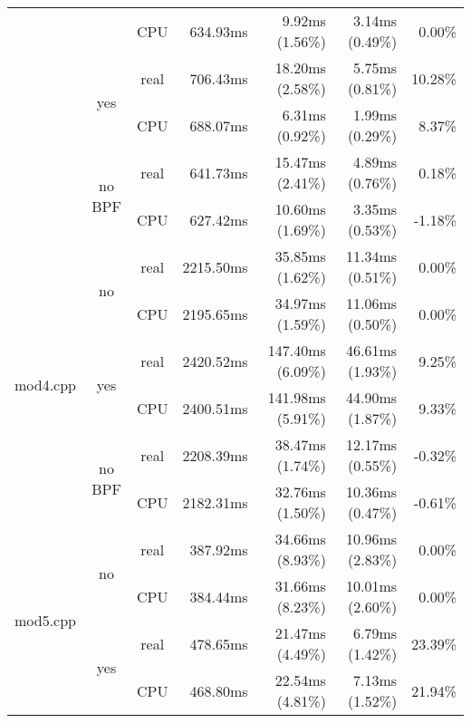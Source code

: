 \documentclass[en]{pracamgr}
\begin{document}
\begin{appendices}
\begin{small}
\begin{longtable}{|l|c|c|r|r|r|r|}
                            &                         & CPU  & 634.93ms & 9.92ms (1.56\%) & 3.14ms (0.49\%) & 0.00\% \\*
                            \cline{2-7}
                            & \multirow{2}{*}{yes}    & real & 706.43ms & 18.20ms (2.58\%) & 5.75ms (0.81\%) & 10.28\% \\*
                            &                         & CPU  & 688.07ms & 6.31ms (0.92\%) & 1.99ms (0.29\%) & 8.37\% \\*
                            \cline{2-7}
                            & \multirow{2}{*}{no BPF} & real & 641.73ms & 15.47ms (2.41\%) & 4.89ms (0.76\%) & 0.18\% \\*
                            &                         & CPU  & 627.42ms & 10.60ms (1.69\%) & 3.35ms (0.53\%) & -1.18\% \\
\hline
\multirow{6}{*}{mod4.cpp}   & \multirow{2}{*}{no}     & real & 2215.50ms & 35.85ms (1.62\%) & 11.34ms (0.51\%) & 0.00\% \\*
                            &                         & CPU  & 2195.65ms & 34.97ms (1.59\%) & 11.06ms (0.50\%) & 0.00\% \\*
                            \cline{2-7}
                            & \multirow{2}{*}{yes}    & real & 2420.52ms & 147.40ms (6.09\%) & 46.61ms (1.93\%) & 9.25\% \\*
                            &                         & CPU  & 2400.51ms & 141.98ms (5.91\%) & 44.90ms (1.87\%) & 9.33\% \\*
                            \cline{2-7}
                            & \multirow{2}{*}{no BPF} & real & 2208.39ms & 38.47ms (1.74\%) & 12.17ms (0.55\%) & -0.32\% \\*
                            &                         & CPU  & 2182.31ms & 32.76ms (1.50\%) & 10.36ms (0.47\%) & -0.61\% \\
\hline
\multirow{6}{*}{mod5.cpp}   & \multirow{2}{*}{no}     & real & 387.92ms & 34.66ms (8.93\%) & 10.96ms (2.83\%) & 0.00\% \\*
                            &                         & CPU  & 384.44ms & 31.66ms (8.23\%) & 10.01ms (2.60\%) & 0.00\% \\*
                            \cline{2-7}
                            & \multirow{2}{*}{yes}    & real & 478.65ms & 21.47ms (4.49\%) & 6.79ms (1.42\%) & 23.39\% \\*
                            &                         & CPU  & 468.80ms & 22.54ms (4.81\%) & 7.13ms (1.52\%) & 21.94\% \\*

\end{longtable}
\end{small}
\end{appendices}
\end{document}
